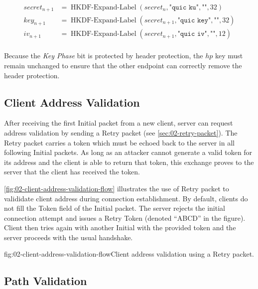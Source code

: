 \begin{equation*}
  \begin{split}
  secret_{n+1} & = \operatorname{HKDF-Expand-Label}(secret_{n}, \texttt{"quic ku"}, \texttt{""}, 32) \\
  key_{n+1} & = \operatorname{HKDF-Expand-Label}(secret_{n+1}, \texttt{"quic key"}, \texttt{""}, 32) \\
  iv_{n+1}  & = \operatorname{HKDF-Expand-Label}(secret_{n+1}, \texttt{"quic iv"}, \texttt{""}, 12)  \\
  \end{split}
\end{equation*}

Because the \textit{Key Phase} bit is protected by header protection, the $hp$ key must remain
unchanged to ensure that the other endpoint can correctly remove the header protection.

\subsection{Client Address Validation}\label{sec:02-address-validation}

After receiving the first Initial packet from a new client, server can request address validation by
sending a Retry packet (see \autoref{sec:02-retry-packet}). The Retry packet carries a token which
must be echoed back to the server in all following Initial packets. As long as an attacker cannot
generate a valid token for its address and the client is able to return that token, this exchange
proves to the server that the client has received the token.

\autoref{fig:02-client-address-validation-flow} illustrates the use of Retry packet to valididate
client address during connection establishment. By default, clients do not fill the Token field of
the Initial packet. The server rejects the initial connection attempt and issues a Retry Token
(denoted ``ABCD'' in the figure). Client then tries again with another Initial with the provided
token and the server proceeds with the usual handshake.

\begin{myFigure}{fig:02-client-address-validation-flow}{Client address validation using a Retry packet.}

\resizebox{\linewidth}{!}{}

\end{myFigure}

\subsection{Path Validation}\label{sec:02-path-validation}

